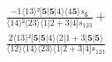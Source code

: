 \documentclass[varwidth, border=5pt]{standalone}
\begin{document}
\begin{my}
$\begin{gathered}
\scriptscriptstyle\frac{-1⟨13⟩²[𝟓|𝟓|4⟩⟨4𝟓⟩s_{𝟓}}{⟨14⟩²⟨23⟩⟨1|2+3|4]s_{123}} +\\
\scriptscriptstyle\frac{2⟨13⟩²[𝟓|𝟓|4⟩⟨2|1+3|𝟓|𝟓⟩}{⟨12⟩⟨14⟩⟨23⟩⟨1|2+3|4]s_{123}} \phantom{+}
\end{gathered}$
\end{my}
\end{document}
